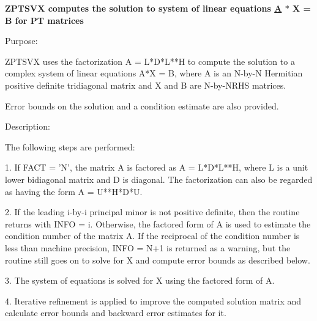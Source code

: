 {\bfseries  Z\+P\+T\+S\+V\+X computes the solution to system of linear equations \hyperlink{classA}{A} $\ast$ X = B for P\+T matrices} 

 \begin{DoxyParagraph}{Purpose\+: }
\begin{DoxyVerb} ZPTSVX uses the factorization A = L*D*L**H to compute the solution
 to a complex system of linear equations A*X = B, where A is an
 N-by-N Hermitian positive definite tridiagonal matrix and X and B
 are N-by-NRHS matrices.

 Error bounds on the solution and a condition estimate are also
 provided.\end{DoxyVerb}
 
\end{DoxyParagraph}
\begin{DoxyParagraph}{Description\+: }
\begin{DoxyVerb} The following steps are performed:

 1. If FACT = 'N', the matrix A is factored as A = L*D*L**H, where L
    is a unit lower bidiagonal matrix and D is diagonal.  The
    factorization can also be regarded as having the form
    A = U**H*D*U.

 2. If the leading i-by-i principal minor is not positive definite,
    then the routine returns with INFO = i. Otherwise, the factored
    form of A is used to estimate the condition number of the matrix
    A.  If the reciprocal of the condition number is less than machine
    precision, INFO = N+1 is returned as a warning, but the routine
    still goes on to solve for X and compute error bounds as
    described below.

 3. The system of equations is solved for X using the factored form
    of A.

 4. Iterative refinement is applied to improve the computed solution
    matrix and calculate error bounds and backward error estimates
    for it.\end{DoxyVerb}
 
\end{DoxyParagraph}

